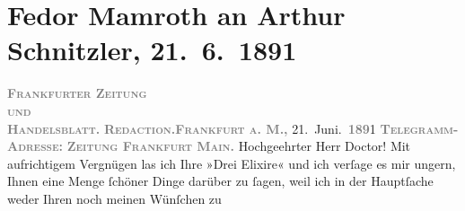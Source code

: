 

         
         \renewcommand{\erwaehntePersonen}{Personen: Karl Bleibtreu, Otto Brahm, Paul Goldmann}
         \renewcommand{\erwaehnteInstitutionen}{Institutionen: Carl Krabbe, Frankfurter Zeitung, Gil Blas, L’Écho de Paris}
         \renewcommand{\erwaehnteOrte}{Orte: Brüssel, Deutschland, Frankfurt am Main, Wien}
         \renewcommand{\erwaehnteWerke}{Werke: Die drei Elixire, Dies Irae. Erinnerungen eines französischen Offiziers an die Tage von Sedan, Frankfurter Zeitung, Freie Bühne für modernes Leben}
               \section[Fedor Mamroth an Arthur Schnitzler, 21. 6. 1891]{ Fedor Mamroth an Arthur Schnitzler, 21. 6. 1891}\nopagebreak{}\rehead{ }\begin{ledgroupsized}[t]{13cm}\normalsize\beginnumbering \toendnotes[C]{\smallbreak\pagebreak[2]} 
\toendnotes[C]{\smallbreak}\pstart
           \noindent{}{\pb}\textcolor{gray}{\textbf{\textsc{Frankfurter Zeitung}}}{\\}\textcolor{gray}{\textbf{\textsc{und}}}{\\}\textcolor{gray}{\textbf{\textsc{Handelsblatt.}}}\pend
           \pstart
           \textcolor{gray}{\textbf{\textsc{Redaction.}}}\hfill \textcolor{gray}{\textbf{\textsc{Frankfurt a. M.,}}}{ }21. Juni. \textcolor{gray}{\textbf{\textsc{189}}}1\pend
           \pstart
           \textcolor{gray}{\textbf{\textsc{Telegramm-Adresse:}}}\pend
           \pstart
           \textcolor{gray}{\textbf{\textsc{Zeitung Frankfurt Main.}}}\pend
           \pstart{}Hochgeehrter Herr Doctor!\pend\pstart
           Mit aufrichtigem Vergnügen las ich Ihre »Drei
                  Elixire« und ich verſage es mir ungern, Ihnen eine Menge ſchöner Dinge
               darüber zu ſagen, weil ich in der Hauptſache weder Ihren noch meinen Wünſchen zu

\end{ledgroupsized}
